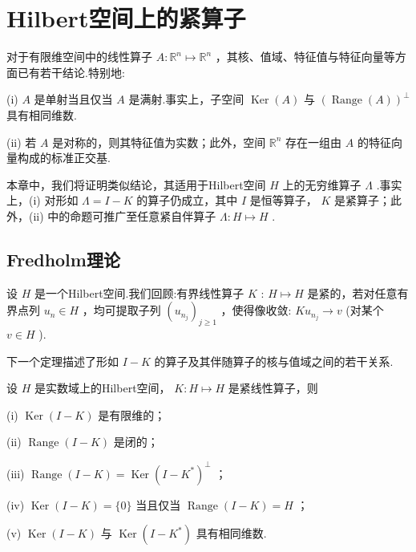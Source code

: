 \chapter{Hilbert空间上的紧算子}\vspace{-2em}

对于有限维空间中的线性算子 $A : {\mathbb{R}}^{n} \mapsto  {\mathbb{R}}^{n}$ ，其核、值域、特征值与特征向量等方面已有若干结论.特别地:

(i) $A$ 是单射当且仅当 $A$ 是满射.事实上，子空间 $\operatorname{Ker}\left( A\right)$ 与 ${\left(  \operatorname{Range}\left( A\right) \right)  }^{ \bot  }$ 具有相同维数.

(ii) 若 $A$ 是对称的，则其特征值为实数；此外，空间 ${\mathbb{R}}^{n}$ 存在一组由 $A$ 的特征向量构成的标准正交基.

本章中，我们将证明类似结论，其适用于Hilbert空间 $H$ 上的无穷维算子 $\Lambda$ .事实上，(i) 对形如 $\Lambda  = I - K$ 的算子仍成立，其中 $I$ 是恒等算子， $K$ 是紧算子；此外，(ii) 中的命题可推广至任意紧自伴算子 $\Lambda  : H \mapsto  H$ .

\section{Fredholm理论}

设 $H$ 是一个Hilbert空间.我们回顾:有界线性算子 $K$ : $H \mapsto  H$ 是紧的，若对任意有界点列 ${u}_{n} \in  H$ ，均可提取子列 ${\left( {u}_{{n}_{j}}\right) }_{j \geq  1}$ ，使得像收敛: $K{u}_{{n}_{j}} \rightarrow  v$ (对某个 $v \in  H$ ).

下一个定理描述了形如 $I - K$ 的算子及其伴随算子的核与值域之间的若干关系.

\begin{theorem}[Fredholm]\label{thm:fredholm}
设 $H$ 是实数域上的Hilbert空间， $K : H \mapsto  H$ 是紧线性算子，则

(i) $\operatorname{Ker}\left( {I - K}\right)$ 是有限维的；

(ii) $\operatorname{Range}\left( {I - K}\right)$ 是闭的；

(iii) $\operatorname{Range}\left( {I - K}\right)  = \operatorname{Ker}{\left( I - {K}^{ * }\right) }^{ \bot  }$ ；

(iv) $\operatorname{Ker}\left( {I - K}\right)  = \{ 0\}$ 当且仅当 $\operatorname{Range}\left( {I - K}\right)  = H$ ；

(v) $\operatorname{Ker}\left( {I - K}\right)$ 与 $\operatorname{Ker}\left( {I - {K}^{ * }}\right)$ 具有相同维数.
\end{theorem}


